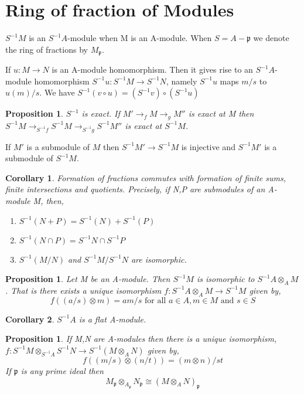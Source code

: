 \documentclass[]{report}
\newtheorem{prop}[theorem]{Proposition}
\newtheorem{corollary}{Corollary}[theorem]
\begin{document}
\section{Ring of fraction of Modules}

$S^{-1}M$ is an $S^{-1}A$-module when M is an A-module. When $S = A-\mathfrak{p}$ we denote the ring of fractions by $M_\mathfrak{p}$.

If $u: M\rightarrow N$ is an A-module homomorphism. Then it gives rise to an $S^{-1}A$-module homomorphism $S^{-1}u: S^{-1}M \rightarrow S^{-1}N$, namely $S^{-1}u$ maps $m/s$ to $u(m)/s$. We have $S^{-1}(v\circ u) = (S^{-1}v) \circ (S^{-1}u)$

\begin{prop}
    $S^{-1}$ is exact.  If $M'\rightarrow_f M \rightarrow_g M''$ is exact at M then $S^{-1}M \rightarrow_{S^{-1}f} S^{-1}M \rightarrow_{S^{-1}g} S^{-1}M''$ is exact at $S^{-1}M$. 
\end{prop}

If $M'$ is a submodule of $M$ then $S^{-1}M' \rightarrow S^{-1}M$ is injective and $S^{-1}M'$ is a submodule of $S^{-1}M$. 

\begin{corollary}
    Formation of fractions commutes with formation of finite sums, finite intersections and quotients. Precisely, if N,P are submodules of an A-module M, then,
    \begin{enumerate}
        \item $S^{-1}(N+P) = S^{-1}(N) + S^{-1}(P)$
        \item $S^{-1}(N\cap P) = S^{-1}N \cap S^{-1}P$
        \item $S^{-1}(M/N)$ and $S^{-1}M / S^{-1}N$ are isomorphic.
    \end{enumerate}
\end{corollary}

\begin{prop}
    Let M be an A-module. Then $S^{-1}M$ is isomorphic to $S^{-1}A \otimes_A M$. That is there exists a unique isomorphism $f:S^{-1}A \otimes_A M \rightarrow S^{-1}M$ given by,
$$f((a/s)\otimes m) = am/s \text{ for all } a\in A, m\in M \text{ and } s\in S$$
\end{prop}

\begin{corollary}
    $S^{-1}A$ is a flat A-module.
\end{corollary}

\begin{prop} 
    If M,N are A-modules then there is a unique isomorphism, $f: S^{-1}M\otimes_{S^{-1}A} S^{-1}N \rightarrow S^{-1}(M\otimes_A N)$ given by,
$$f((m/s)\otimes (n/t)) = (m\otimes n)/st$$
If $\mathfrak{p}$ is any prime ideal then
$$M_\mathfrak{p}\otimes_{A_\mathfrak{p}} N_\mathfrak{p} \cong (M\otimes_A N)_\mathfrak{p}$$
\end{prop}
\end{document}
